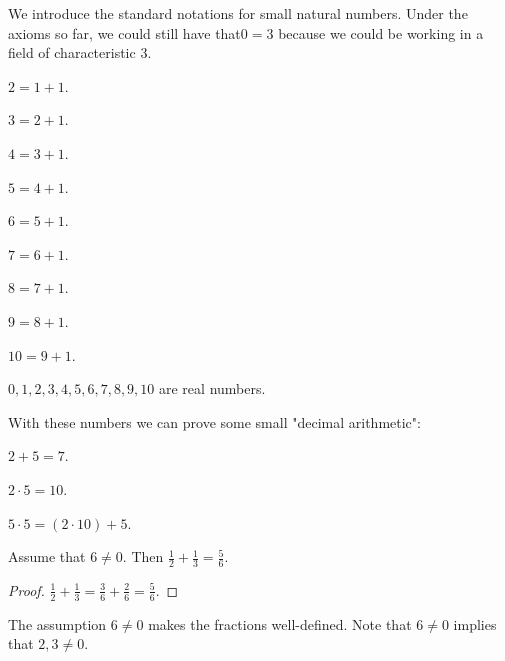 \documentclass{article}
\begin{document}
We introduce the standard notations for small natural numbers.
Under the axioms so far, we could still have that$0 = 3$ because
we could be working in a field of characteristic $3$.

\begin{forthel}

\begin{definition}
$2 = 1 + 1$.
\end{definition}

\begin{definition}
$3 = 2 + 1$.
\end{definition}

\begin{definition}
$4 = 3 + 1$.
\end{definition}

\begin{definition}
$5 = 4 + 1$.
\end{definition}

\begin{definition}
$6 = 5 + 1$.
\end{definition}

\begin{definition}
$7 = 6 + 1$.
\end{definition}

\begin{definition}
$8 = 7 + 1$.
\end{definition}

\begin{definition}
$9 = 8 + 1$.
\end{definition}

\begin{definition}
$10 = 9 + 1$.
\end{definition}

\begin{lemma}
$0,1,2,3,4,5,6,7,8,9,10$ are real numbers.
\end{lemma}

\end{forthel}
%
With these numbers we can prove some small "decimal arithmetic":
\begin{forthel}
%
\begin{lemma}
$2 + 5 = 7$.
\end{lemma}

\begin{lemma}
$2 \cdot 5 = 10$.
\end{lemma}

\begin{lemma}
$5 \cdot 5 = (2 \cdot 10) + 5$.
\end{lemma}

\begin{lemma} Assume that $6 \neq 0$. Then
$\frac{1}{2} + \frac{1}{3} = \frac{5}{6}$.
\end{lemma}
\begin{proof}
$\frac{1}{2} + \frac{1}{3} = \frac{3}{6} + \frac{2}{6} = \frac{5}{6}$.
\end{proof}
\end{forthel}
The assumption $6 \neq 0$ makes
the fractions well-defined. Note that $6 \neq 0$ implies
that $2,3 \neq 0$.
\end{document}
